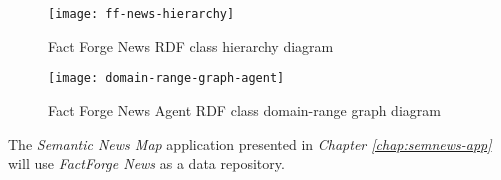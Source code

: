\begin{figure}[h!]
    \centering
    \texttt{[image: ff-news-hierarchy]}
    \caption{Fact Forge News RDF class hierarchy diagram}
    \label{fig:ff-news-hierarchy}
\end{figure}

\begin{figure}[h!]
    \centering
    \texttt{[image: domain-range-graph-agent]}
    \caption{Fact Forge News Agent RDF class domain-range graph diagram}
    \label{fig:domain-range-graph-agent}
\end{figure}
The \textit{Semantic News Map} application presented in \textit{Chapter \ref{chap:semnews-app}} will use \textit{FactForge News} as a data repository. 
